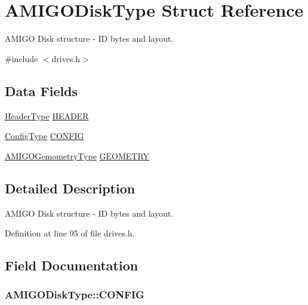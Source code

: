 \hypertarget{structAMIGODiskType}{}\section{A\+M\+I\+G\+O\+Disk\+Type Struct Reference}
\label{structAMIGODiskType}


A\+M\+I\+GO Disk structure -\/ ID bytes and layout.  




{\ttfamily \#include $<$drives.\+h$>$}

\subsection*{Data Fields}
\begin{DoxyCompactItemize}
\item 
\hyperlink{structHeaderType}{Header\+Type} \hyperlink{structAMIGODiskType_a9814efe6f564b104fc7e0100231908a8}{H\+E\+A\+D\+ER}
\item 
\hyperlink{structConfigType}{Config\+Type} \hyperlink{structAMIGODiskType_aae94c3403ceb917006591e7bd4109207}{C\+O\+N\+F\+IG}
\item 
\hyperlink{structAMIGOGemometryType}{A\+M\+I\+G\+O\+Gemometry\+Type} \hyperlink{structAMIGODiskType_aa75cfbfabf8081ff7bca08cf87af4da8}{G\+E\+O\+M\+E\+T\+RY}
\end{DoxyCompactItemize}


\subsection{Detailed Description}
A\+M\+I\+GO Disk structure -\/ ID bytes and layout. 

Definition at line 95 of file drives.\+h.



\subsection{Field Documentation}
\subsubsection[{\texorpdfstring{C\+O\+N\+F\+IG}{CONFIG}}]{ A\+M\+I\+G\+O\+Disk\+Type\+::\+C\+O\+N\+F\+IG}\hypertarget{structAMIGODiskType_aae94c3403ceb917006591e7bd4109207}{}\label{structAMIGODiskType_aae94c3403ceb917006591e7bd4109207}


